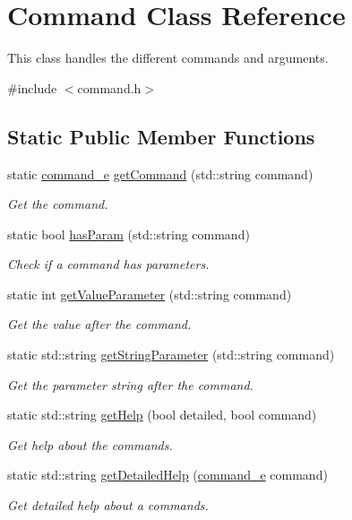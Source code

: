 \hypertarget{class_command}{}\section{Command Class Reference}
\label{class_command}


This class handles the different commands and arguments.  




{\ttfamily \#include $<$command.\+h$>$}

\subsection*{Static Public Member Functions}
\begin{DoxyCompactItemize}
\item 
static \hyperlink{command_8h_aafce48252f7b3163fa15e458dd84ba12}{command\+\_\+e} \hyperlink{class_command_a0a461c50ca91c39c699d35da1ae4d66d}{get\+Command} (std\+::string command)
\begin{DoxyCompactList}\small\item\em Get the command. \end{DoxyCompactList}\item 
static bool \hyperlink{class_command_acd56e84b950706980dd10a0bd32e8a44}{has\+Param} (std\+::string command)
\begin{DoxyCompactList}\small\item\em Check if a command has parameters. \end{DoxyCompactList}\item 
static int \hyperlink{class_command_a675b10cacf1cfa1713c3e0eb6b1263d3}{get\+Value\+Parameter} (std\+::string command)
\begin{DoxyCompactList}\small\item\em Get the value after the command. \end{DoxyCompactList}\item 
static std\+::string \hyperlink{class_command_a7b5c3b86ee68389a5ddb732e52d7b225}{get\+String\+Parameter} (std\+::string command)
\begin{DoxyCompactList}\small\item\em Get the parameter string after the command. \end{DoxyCompactList}\item 
static std\+::string \hyperlink{class_command_aa64031bdfbbdcf55aba21c7864a7e49c}{get\+Help} (bool detailed, bool command)
\begin{DoxyCompactList}\small\item\em Get help about the commands. \end{DoxyCompactList}\item 
static std\+::string \hyperlink{class_command_aa3cc08d74680f515249d5a12f3afaeb6}{get\+Detailed\+Help} (\hyperlink{command_8h_aafce48252f7b3163fa15e458dd84ba12}{command\+\_\+e} command)
\begin{DoxyCompactList}\small\item\em Get detailed help about a commands. \end{DoxyCompactList}\end{DoxyCompactItemize}
